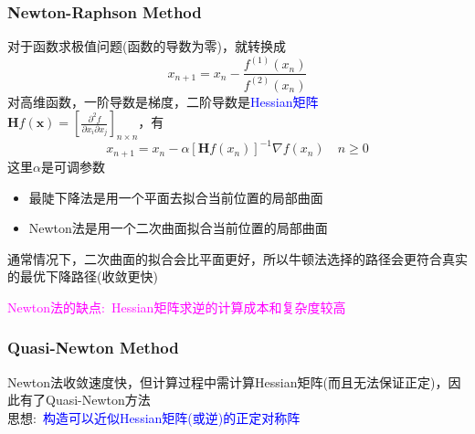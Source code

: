 \frame
{
	\frametitle{\textrm{Newton-Raphson Method}}
	对于函数求极值问题(函数的导数为零)，就转换成
	\begin{displaymath}
		x_{n+1}=x_{n}-\dfrac{f^{(1)}(x_n)}{f^{(2)}(x_n)}
	\end{displaymath}
	对高维函数，一阶导数是梯度，二阶导数是\textcolor{blue}{\textrm{Hessian}矩阵}\\$\mathbf{H}f(\mathbf{x})=[\frac{\partial^2f}{\partial x_i\partial x_j}]_{n\times n}$，有
	\begin{displaymath}
		x_{n+1}=x_n-\alpha[\mathbf{H}f(x_n)]^{-1}\nabla f(x_n)\quad n\geqslant0
	\end{displaymath}
	这里$\alpha$是可调参数%

	\begin{itemize}
		\item 最陡下降法是用一个平面去拟合当前位置的局部曲面
		\item \textrm{Newton}法是用一个二次曲面拟合当前位置的局部曲面
	\end{itemize}
通常情况下，二次曲面的拟合会比平面更好，所以牛顿法选择的路径会更符合真实的最优下降路径(收敛更快)

\textcolor{magenta}{\textrm{Newton}法的缺点:~\textrm{Hessian}矩阵求逆的计算成本和复杂度较高}
}

\frame
{
	\frametitle{\textrm{Quasi-Newton Method}}
	\textrm{Newton}法收敛速度快，但计算过程中需计算\textrm{Hessian}矩阵(而且无法保证正定)，因此有了\textrm{Quasi-Newton}方法\\
	思想:~\textcolor{blue}{构造可以近似\textrm{Hessian}矩阵(或逆)的正定对称阵}
		{\fontsize{7.2pt}{4.2pt}}
{\fontsize{9.2pt}{4.2pt}}
}

